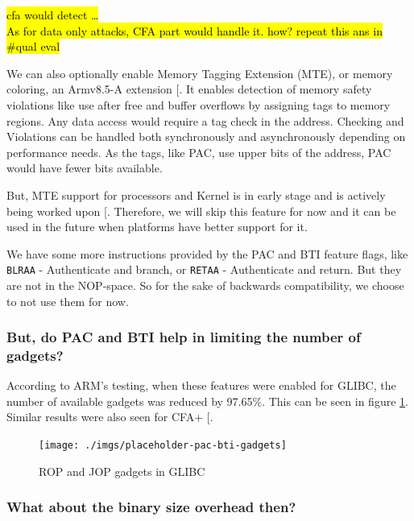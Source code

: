 \documentclass[a4paper, nobind]{templates/ociamthesis}
\begin{document}
\hl{cfa would detect \ldots{}\\
As for data only attacks, CFA part would handle it. how? repeat this ans in \#qual eval}

We can also optionally enable Memory Tagging Extension (MTE), or memory coloring,
an Armv8.5-A extension {[}\citeproc{ref-arm-pacbti}{9}{]}. It enables detection of memory safety violations like use after free
and buffer overflows by assigning tags to memory regions. Any data access would
require a tag check in the address. Checking and Violations can be handled both
synchronously and asynchronously depending on performance needs.
As the tags, like PAC, use upper bits of the address, PAC would have fewer bits available.

But, MTE support for processors and Kernel is in early stage and is actively being worked upon {[}\citeproc{ref-mte-kern-patch}{56}{]}.
Therefore, we will skip this feature for now and it can be used in the future when platforms
have better support for it.

We have some more instructions provided by the PAC and BTI feature flags,
like \texttt{BLRAA} - Authenticate and branch, or \texttt{RETAA} - Authenticate and return.
But they are not in the NOP-space. So for the sake of backwards compatibility,
we choose to not use them for now.

\subsubsection{But, do PAC and BTI help in limiting the number of gadgets?}\label{but-do-pac-and-bti-help-in-limiting-the-number-of-gadgets}

According to ARM's testing, when these features were enabled for GLIBC, the number
of available gadgets was reduced by 97.65\%. This can be seen in figure \ref{fig:pac-bti-gadgets}.
Similar results were also seen for CFA+ {[}\citeproc{ref-cfaplus}{4}{]}.

\begin{figure}

{\centering \texttt{[image: ./imgs/placeholder-pac-bti-gadgets]} 

}

\caption{ROP and JOP gadgets in GLIBC}\label{fig:pac-bti-gadgets}
\end{figure}

\subsubsection{What about the binary size overhead then?}\label{what-about-the-binary-size-overhead-then}
\end{document}
